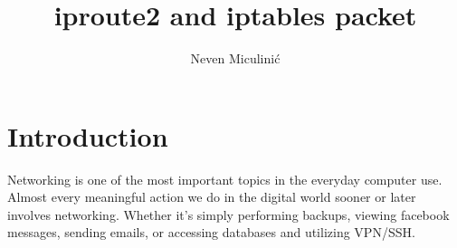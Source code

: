 \documentclass[times, utf8, seminar, english]{fer}
\begin{document}
\theoremstyle{definition}
\newtheorem{definition}{Definition}[section]
\title{iproute2 and iptables packet}
\author{Neven Miculini\'{c}}

\maketitle
\tableofcontents


\chapter{Introduction}

Networking is one of the most important topics in the everyday computer use. Almost every meaningful action we do in the digital world sooner or later involves networking. Whether it's simply performing backups, viewing facebook messages, sending emails, or accessing databases and utilizing VPN/SSH.
\end{document}
